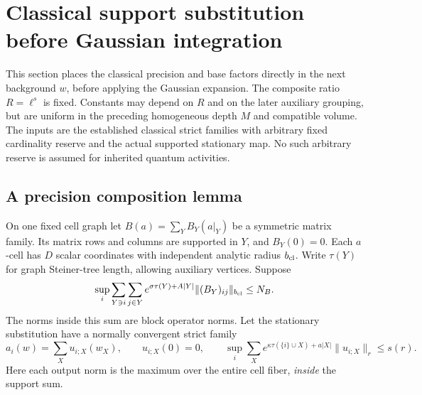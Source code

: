 \section{Classical support substitution before Gaussian integration}
\label{cdc-section}

This section places the classical precision and base factors directly
in the next background $w$, before applying the Gaussian expansion.
The composite ratio $R=\ell^s$ is fixed. Constants may depend on
$R$ and on the later auxiliary grouping, but are uniform in the
preceding homogeneous depth $M$ and compatible volume. The inputs
are the established classical strict families with arbitrary fixed
cardinality reserve and the actual supported stationary map. No
such arbitrary reserve is assumed for inherited quantum activities.

\subsection{A precision composition lemma}
\label{cdc-precision-section}

On one fixed cell graph let
$B(a)=\sum_Y B_Y(a|_Y)$ be a symmetric matrix family. Its matrix
rows and columns are supported in $Y$, and $B_Y(0)=0$. Each
$a$-cell has $D$ scalar coordinates with independent analytic
radius $b_{\rm cl}$. Write $\tau(Y)$ for graph Steiner-tree length,
allowing auxiliary vertices. Suppose
\begin{equation}
 \sup_i\sum_{Y\ni i}\sum_{j\in Y}
 e^{\sigma\tau(Y)+A|Y|}
       \|(B_Y)_{ij}\|_{b_{\rm cl}}\leq N_B.
 \label{cdc-precision-input}
\end{equation}
The norms inside this sum are block operator norms. Let the
stationary substitution have a normally convergent strict family
\begin{equation}
 a_i(w)=\sum_X u_{i;X}(w_X),\qquad u_{i;X}(0)=0,\qquad
 \sup_i\sum_Xe^{\kappa\tau(\{i\}\cup X)+a|X|}
                         \|u_{i;X}\|_r\leq s(r).
 \label{cdc-map-input}
\end{equation}
Here each output norm is the maximum over the entire cell fiber,
\emph{inside} the support sum.

